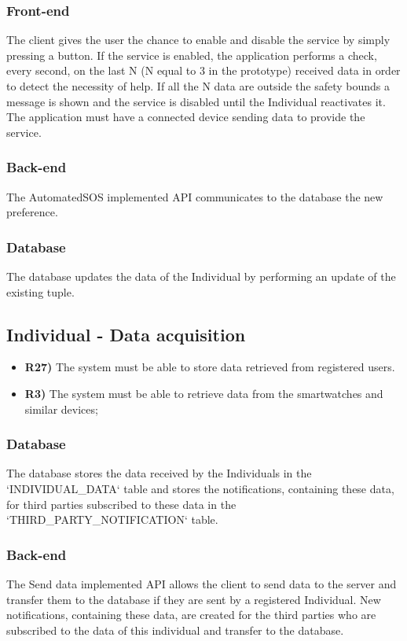 \subsubsection*{Front-end}
The client gives the user the chance to enable and disable the service by simply pressing a button. If the service is enabled, the application performs a check, every second, on the last N (N equal to 3 in the prototype) received data in order to detect the necessity of help. If all the N data are outside the safety bounds a message is shown and the service is disabled until the Individual reactivates it.
The application must have a connected device sending data to provide the service.

\subsubsection*{Back-end}
The AutomatedSOS implemented API communicates to the database the new preference. 

\subsubsection*{Database}
The database updates the data of the Individual by performing an update of the existing tuple.


\subsection{Individual - Data acquisition}
\begin{itemize}	
	\item {\color{Green}\textbf{R27)}} The system must be able to store data retrieved from registered users.
	\item {\color{Red}\textbf{R3)}} The system must be able to retrieve data from the smartwatches and similar devices;
\end{itemize}

\subsubsection*{Database}
The database stores the data received by the Individuals in the `INDIVIDUAL\_DATA` table and stores the notifications, containing these data, for third parties subscribed to these data in the `THIRD\_PARTY\_NOTIFICATION` table.

\subsubsection*{Back-end}
The Send data implemented API allows the client to send data to the server and transfer them to the database if they are sent by a registered Individual.
New notifications, containing these data, are created for the third parties who are subscribed to the data of this individual and transfer to the database.

